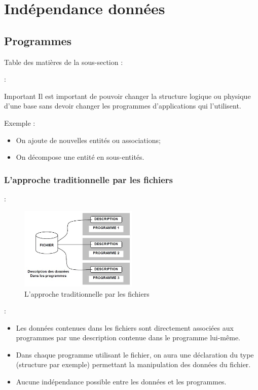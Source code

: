 \documentclass[10pt]{beamer}
\newcommand{\tocsss}{\begin{frame}[allowframebreaks]{Table des matières de la sous-section : \subsecname}
    \tableofcontents[
    currentsection,
    currentsubsection,
    hideothersubsections,
    sectionstyle=hide/hide
]
\end{frame}}
\begin{document}
\section{Indépendance données}
\subsection{Programmes}
\tocsss
\begin{frame}{\secname : \subsecname}
    \begin{alertblock}{Important}
        Il est important de pouvoir changer la structure logique ou physique d’une base sans devoir changer les programmes d’applications qui l’utilisent.
    \end{alertblock}
    Exemple :

    \begin{itemize}
        \item On ajoute de nouvelles entités ou associations;
        \item On décompose une entité en sous-entités.
    \end{itemize}
\end{frame}


\subsubsection{L’approche traditionnelle par les fichiers}
\begin{frame}{\subsecname : \subsubsecname}
    \begin{figure}
        \begin{center}
            \includegraphics[width=0.5\textwidth]{../assets/img/par_fichier.jpg}
            \caption{L’approche traditionnelle par les fichiers}
            \label{Fig:par_fichier}
        \end{center}
    \end{figure}
\end{frame}



\begin{frame}{\subsecname : \subsubsecname}
    \begin{itemize}
        \item Les données contenues dans les fichiers sont directement associées aux programmes par une description contenue dans le programme lui-même.
        \item Dans chaque programme utilisant le fichier, on aura une déclaration du type (structure par exemple) permettant la manipulation des données du fichier.
        \item Aucune indépendance possible entre les données et les programmes.
    \end{itemize}
\end{frame}
\end{document}
